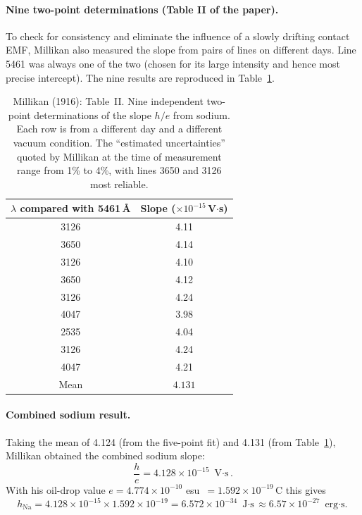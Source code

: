 \documentclass[12pt]{article}
\begin{document}
\paragraph{Nine two-point determinations (Table II of the paper).}
To check for consistency and eliminate the influence of a slowly drifting
contact EMF, Millikan also measured the slope from pairs of lines on
different days.  Line 5461 was always one of the two (chosen for its
large intensity and hence most precise intercept).  The nine results are
reproduced in Table~\ref{tab:slope_determinations}.

\begin{table}[ht]
\centering
\caption{Millikan (1916): Table~II.  Nine independent two-point
determinations of the slope $h/e$ from sodium.  Each row is from
a different day and a different vacuum condition.
The ``estimated uncertainties'' quoted by Millikan at the time of
measurement range from 1\% to 4\%, with lines 3650 and 3126 most
reliable.}
\label{tab:slope_determinations}
\begin{tabular}{cc}
\toprule
$\lambda$ compared with 5461\,\AA & Slope ($\times 10^{-15}$\,V$\cdot$s) \\
\midrule
3126  & 4.11 \\
3650  & 4.14 \\
3126  & 4.10 \\
3650  & 4.12 \\
3126  & 4.24 \\
4047  & 3.98 \\
2535  & 4.04 \\
3126  & 4.24 \\
4047  & 4.21 \\
\midrule
Mean  & $\mathbf{4.131}$ \\
\bottomrule
\end{tabular}
\end{table}

\paragraph{Combined sodium result.}
Taking the mean of 4.124 (from the five-point fit) and 4.131 (from
Table~\ref{tab:slope_determinations}), Millikan obtained the combined
sodium slope:
\[
  \frac{h}{e} = 4.128 \times 10^{-15}\text{ V$\cdot$s}.
\]
With his oil-drop value $e = 4.774\times10^{-10}$ esu~$= 1.592\times10^{-19}$\,C
this gives
\[
  h_{\text{Na}} = 4.128\times10^{-15}\times 1.592\times10^{-19}
  = 6.572\times10^{-34}\text{ J$\cdot$s}
  \approx 6.57\times10^{-27}\text{ erg$\cdot$s.}
\]
\end{document}
